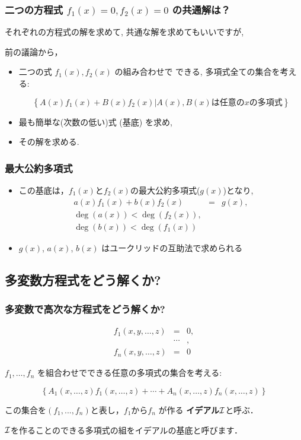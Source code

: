 \begin{frame}\frametitle{
二つの方程式  $f_1(x)=0, f_2(x)=0$ の共通解は？}

  それぞれの方程式の解を求めて, 共通な解を求めてもいいですが,

  前の議論から，

\begin{itemize}
\item 二つの式 $f_1(x), f_2(x)$ の組み合わせで
  できる, 多項式全ての集合を考える:

    \[
\left\{A(x) f_1(x) + B(x) f_2(x) | A(x), B(x) \mbox{は任意の$x$の多項式}\right\}
\]


\item 最も簡単な(次数の低い)式 (基底) を求め,
\item その解を求める.
\end{itemize}  
\end{frame}

\begin{frame}\frametitle{最大公約多項式}
\begin{itemize}
\item この基底は，$f_1(x)$と$f_2(x)$の最大公約多項式($g(x)$)となり,
  \[
  \begin{array}{lcr}
    a(x) f_1(x) + b(x) f_2(x) & = & g(x),\\
    \deg(a(x)) < \deg(f_2(x)),\\
    \deg(b(x)) < \deg(f_1(x)) 
  \end{array}
  \]

\item $g(x)$, $a(x)$, $b(x)$ はユークリッドの互助法で求められる
  
\end{itemize}
\end{frame}

\subsection{多変数方程式をどう解くか?}

\begin{frame}\frametitle{多変数で高次な方程式をどう解くか?}
\[
  \begin{array}{rcl}
    f_1(x, y, \ldots, z) & = & 0, \\
    &\cdots&, \\
    f_n(x, y, \ldots, z) & = & 0
  \end{array}
\]

$f_1, \ldots, f_n$ を組合わせでできる任意の多項式の集合を考える:

\[ 
\left\{ A_1(x, \ldots, z) f_1(x, \ldots, z) + \cdots + A_n(x, \ldots, z)
 f_n(x, \ldots, z) \right\}
\]

この集合を$(f_1, ... , f_n)$と表し，$f_1$から$f_n$ が作る
{\bf イデアル}${\cal I}$と呼ぶ．

${\cal I}$を作ることのできる多項式の組をイデアルの基底と呼びます．

\end{frame}

